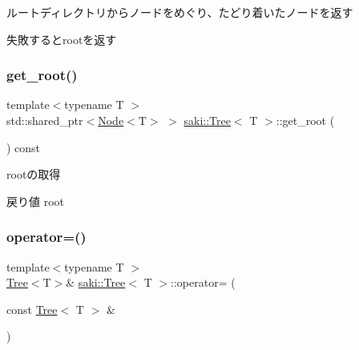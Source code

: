 ルートディレクトリからノードをめぐり、たどり着いたノードを返す 

失敗するとrootを返す \mbox{\label{classsaki_1_1_tree_a5ca3a3226e542530008a270ee958d6e1}} 
\subsubsection{\texorpdfstring{get\+\_\+root()}{get\_root()}}
{\footnotesize\ttfamily template$<$typename T $>$ \\
std\+::shared\+\_\+ptr$<$\mbox{\hyperlink{classsaki_1_1_node}{Node}}$<$T$>$ $>$ \mbox{\hyperlink{classsaki_1_1_tree}{saki\+::\+Tree}}$<$ T $>$\+::get\+\_\+root (\begin{DoxyParamCaption}{ }\end{DoxyParamCaption}) const\hspace{0.3cm}{\ttfamily [inline]}}



rootの取得 

\begin{DoxyReturn}{戻り値}
root 
\end{DoxyReturn}
\mbox{\label{classsaki_1_1_tree_ab5f73b5b7cee4f70663d03803401547b}} 
\subsubsection{\texorpdfstring{operator=()}{operator=()}\hspace{0.1cm}{\footnotesize\ttfamily [1/2]}}
{\footnotesize\ttfamily template$<$typename T $>$ \\
\mbox{\hyperlink{classsaki_1_1_tree}{Tree}}$<$T$>$\& \mbox{\hyperlink{classsaki_1_1_tree}{saki\+::\+Tree}}$<$ T $>$\+::operator= (\begin{DoxyParamCaption}\item[{const \mbox{\hyperlink{classsaki_1_1_tree}{Tree}}$<$ T $>$ \&}]{ }\end{DoxyParamCaption})\hspace{0.3cm}{\ttfamily [default]}}

\mbox{\label{classsaki_1_1_tree_a71749080c165c790b38596e5c0c151df}} 
